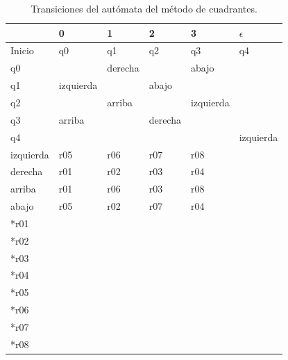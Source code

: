 	 \begin{table}[hbtp]
		 \centering
			\caption{Transiciones del autómata del método de cuadrantes.}		 
			\begin{tabular}{ | l | l | l | l | l | l |}
			\hline
			  \rowcolor[gray]{0.5}
				   & 0         & 1       & 2       & 3         &$\epsilon$   \\ \hline
			Inicio & q0        & q1      & q2      & q3        & q4         \\ \hline      
				q0 &           & derecha &         & abajo     &            \\ \hline
				q1 & izquierda &         & abajo   &           &            \\ \hline
				q2 &           & arriba  &         & izquierda &            \\ \hline
				q3 & arriba    &         & derecha &           &            \\ \hline
				q4 &           &         &         &           & izquierda  \\ \hline
		 izquierda & r05       & r06     & r07     & r08       &            \\ \hline
		   derecha & r01       & r02     & r03     & r04       &            \\ \hline
			arriba & r01       & r06     & r03     & r08       &            \\ \hline
			 abajo & r05       & r02     & r07     & r04       &            \\ \hline
			  *r01 &           &         &         &           &            \\ \hline
			  *r02 &           &         &         &           &            \\ \hline
			  *r03 &           &         &         &           &            \\ \hline
			  *r04 &           &         &         &           &            \\ \hline
			  *r05 &           &         &         &           &            \\ \hline
			  *r06 &           &         &         &           &            \\ \hline
			  *r07 &           &         &         &           &            \\ \hline
			  *r08 &           &         &         &           &            \\ \hline
			\end{tabular}
			\label{table:Automata}
	\end{table}
    

